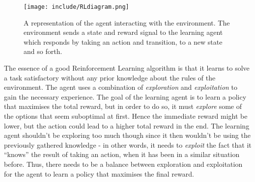 \documentclass[11pt]{article}
\begin{document}
\begin{figure}[!h]
    \centering
    \texttt{[image: include/RLdiagram.png]}
    \caption{A representation of the agent interacting with the environment.
        The environment sends a state and reward signal to the
    learning agent which responds by taking an action and transition, to a new state and so forth.}
    \label{fig:agent_environment}
\end{figure}

The essence of a good Reinforcement Learning algorithm is that it learns 
to solve a task satisfactory without any prior knowledge about the rules of the environment.
The agent uses a combination of \textit{exploration} and \textit{exploitation}
to gain the necessary experience.
The goal of the learning agent is to learn a policy that maximises the total reward, but in order to do
so, it must \textit{explore} some of the options that seem suboptimal at first.
Hence the immediate reward might be lower, but the action could lead to a higher total reward in the end.
The learning agent shouldn't be exploring too much though since it then wouldn't
be using the previously gathered knowledge - in other words, it needs to
\textit{exploit} the fact that it “knows” the result of taking an action, when it has been in
a similar situation before.
Thus, there needs to be a balance between exploration and exploitation for the
agent to learn a policy that maximises the final reward.
\end{document}
